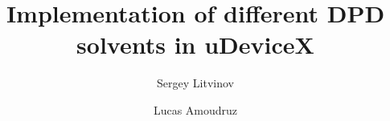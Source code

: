 \author{Sergey Litvinov \and Lucas Amoudruz}
\title{Implementation of different DPD solvents in uDeviceX}
\date{}
